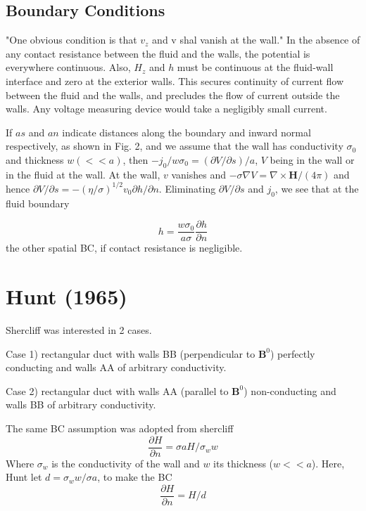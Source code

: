 \documentclass[11pt]{article}
\newcommand{\B}{\mathbf{B}}
\renewcommand{\H}{\mathbf{H}}
\newcommand{\curl}{\nabla \times}
\newcommand{\PD}{\partial}
\begin{document}
\subsection{Boundary Conditions}
"One obvious condition is that $v_z$ and v shal vanish at the wall." In the absence of any contact resistance between the fluid and the walls, the potential is everywhere continuous. Also, $H_z$ and $h$ must be continuous at the fluid-wall interface and zero at the exterior walls. This secures continuity of current flow between the fluid and the walls, and precludes the flow of current outside the walls. Any voltage measuring device would take a negligibly small current.

If $as$ and $an$ indicate distances along the boundary and inward normal respectively, as shown in Fig. 2, and we assume that the wall has conductivity $\sigma_0$ and thickness $w (<<a)$, then $-j_0/w \sigma_0 = (\PD V/\PD s)/a$, $V$ being in the wall or in the fluid at the wall. At the wall, $v$ vanishes and $-\sigma \nabla V = \curl \H/(4 \pi)$ and hence $\PD V/\PD s = -(\eta/\sigma)^{1/2} v_0 \PD h/\PD n$. Eliminating $\PD V/\PD s$ and $j_0$, we see that at the fluid boundary

\begin{equation}
  h = \frac{w \sigma_0}{a \sigma} \frac{\PD h}{\PD n}
\end{equation}
the other spatial BC, if contact resistance is negligible.

\section{Hunt (1965)}
Shercliff was interested in 2 cases.

\noindent
Case 1) rectangular duct with walls BB (perpendicular to $\B^0$) perfectly conducting and walls AA of arbitrary conductivity.

\noindent
Case 2) rectangular duct with walls AA (parallel to $\B^0$) non-conducting and walls BB of arbitrary conductivity.

\noindent
The same BC assumption was adopted from shercliff
\begin{equation}
  \frac{\PD H}{\PD n} = \sigma a H / \sigma_w w
\end{equation}
Where $\sigma_w$ is the conductivity of the wall and $w$ its thickness ($w<<a$). Here, Hunt let $d = \sigma_w w/\sigma a$, to make the BC
\begin{equation}
  \frac{\PD H}{\PD n} = H / d
\end{equation}
\end{document}
